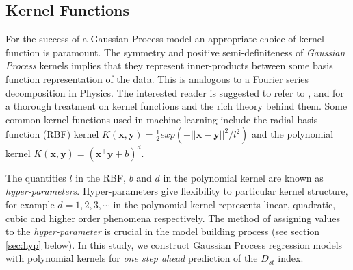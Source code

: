 \documentclass[referee,a4paper,12pt,traditabstract]{swsc}
\begin{document}
\begin{linenumbers}
\subsection{Kernel Functions}

For the success of a Gaussian Process model an appropriate choice of kernel function is paramount. The symmetry and positive semi-definiteness of \emph{Gaussian Process} kernels implies that they represent inner-products between some basis function representation of the data. This is analogous to a Fourier series decomposition in Physics. The interested reader is suggested to refer to \cite{Berlinet2004}, \citet{Scholkopf:2001:LKS:559923} and \citet{hofmann2008} for a thorough treatment on kernel functions and the rich theory behind them. Some common kernel functions used in machine learning include the radial basis function (RBF) kernel $K(\mathbf{x}, \mathbf{y}) = \frac{1}{2} exp(-||\mathbf{x} - \mathbf{y}||^2/l^2)$ and the polynomial kernel $K(\mathbf{x}, \mathbf{y}) = (\mathbf{x}^\intercal \mathbf{y} + b)^d$. 

The quantities $l$ in the RBF, $b$ and $d$ in the polynomial kernel are known as \emph{hyper-parameters}. Hyper-parameters give flexibility to particular kernel structure, for example $d = 1, 2, 3, \cdots$ in the polynomial kernel represents linear, quadratic, cubic and higher order phenomena respectively. The method of assigning values to the \emph{hyper-parameter} is crucial in the model building process (see section \ref{sec:hyp} below). In this study, we construct Gaussian Process regression models with polynomial kernels for \emph{one step ahead} prediction of the $D_{st}$ index. 

\end{linenumbers}
\end{document}

